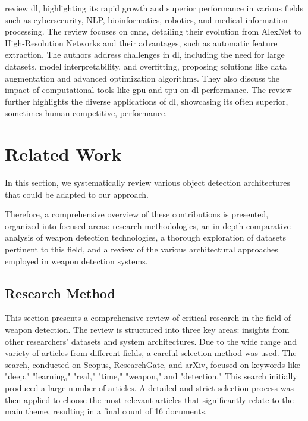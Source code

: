 \citet{rfc10} review \ac{dl}, highlighting its rapid growth and superior 
performance in various 
fields such as cybersecurity, NLP, bioinformatics, robotics, and medical information processing. The review 
focuses on \ac{cnn}s, detailing their evolution from AlexNet to High-Resolution 
Networks and their advantages, such as automatic feature extraction. The authors address challenges in 
\ac{dl}, including the need for large datasets, model interpretability, and overfitting, proposing solutions like 
data augmentation and advanced optimization algorithms. They also discuss the impact of computational tools 
like \ac{gpu} and \ac{tpu} on \ac{dl} performance. The 
review further highlights the diverse applications of \ac{dl}, showcasing its often superior, sometimes 
human-competitive, performance.

\section{Related Work}
In this section, we systematically review various object detection architectures that could be 
adapted to our approach. 

Therefore, a comprehensive overview of these contributions is presented, organized 
into focused areas: research methodologies, an in-depth comparative analysis of weapon detection technologies, a 
thorough exploration of datasets pertinent to this field, and a review of the various architectural approaches 
employed in weapon detection systems.

\subsection{Research Method}
This section presents a comprehensive review of critical research in the field of weapon detection. 
The review is structured into three key areas: insights from other 
researchers' datasets and system architectures. Due to the wide range 
and variety of articles from different fields, a careful selection method was used. The search, conducted on 
Scopus, ResearchGate, and arXiv, focused on keywords like "deep," "learning," "real," "time," "weapon," and 
"detection." This search initially produced a large number of articles. A detailed and strict selection process 
was then applied to choose the most relevant articles that significantly relate to the main theme, 
resulting in a final count of 16 documents.

